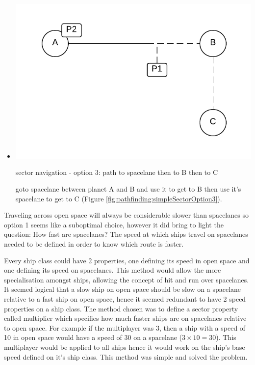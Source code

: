 \begin{itemize}
\item 
\begin{marginfigure}
	\includegraphics{res/pathfinding/PathFindingSectorOption3.pdf}
    \caption{sector navigation - option 3: path to spacelane then to B then to C}
	\label{fig:pathfinding:simpleSectorOption3}
\end{marginfigure}
goto spacelane between planet A and B and use it to get to B then use it's spacelane to get to C (Figure \ref{fig:pathfinding:simpleSectorOption3}).

\end{itemize}

Traveling across open space will always be considerable slower than spacelanes so option 1 seems like a suboptimal choice, however it did bring to light the question: How fast are spacelanes?
The speed at which ships travel on spacelanes needed to be defined in order to know which route is faster.

Every ship class could have 2 properties, one defining its speed in open space and one defining its speed on spacelanes.
This method would allow the more specialisation amongst ships, allowing the concept of hit and run over spacelanes. 
It seemed logical that a slow ship on open space should be slow on a spacelane relative to a fast ship on open space, hence it seemed redundant to have 2 speed properties on a ship class.
The method chosen was to define a sector property called multiplier which specifies how much faster ships are on spacelanes relative to open space.
For example if the multiplayer was 3, then a ship with a speed of 10 in open space would have a speed of 30 on a spacelane ($ 3 \times 10 = 30 $).
This multiplayer would be applied to all ships hence it would work on the ship's base speed defined on it's ship class.
This method was simple and solved the problem.

